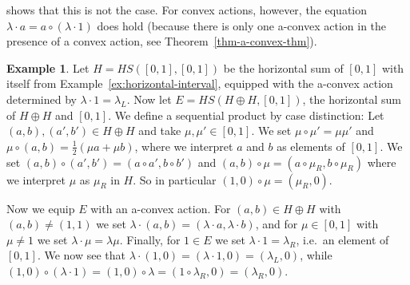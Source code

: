 \documentclass[a4paper, onecolumn, accepted=2020-12-22]{quantumarticle}
\newcommand{\mult}{\mathop{\circ}}
\newcounter{counter}
\theoremstyle{definition}
\newtheorem{example}[counter]{Example}
\begin{document}
shows that this is not the case.
For convex actions, however,
the equation $\lambda\cdot a=a\mult(\lambda\cdot 1)$ 
does hold
(because there is only one a-convex action
in the presence of a convex action, see Theorem~\ref{thm-a-convex-thm}).
\begin{example}
  \label{ex-aconvex-not-determined-by-scalars}
    Let $H=HS([0,1],[0,1])$ be the horizontal sum of $[0,1]$ with itself from Example~\ref{ex:horizontal-interval}, equipped with the a-convex action determined by $\lambda\cdot 1 = \lambda_L$.
    Now let $E=HS(H\oplus H, [0,1])$, the horizontal sum of $H\oplus H$ and $[0,1]$. We define a sequential product by case distinction: Let $(a,b),(a',b')\in H\oplus H$ and take $\mu,\mu' \in[0,1]$. We set $\mu\mult \mu' = \mu\mu'$ and $\mu\mult (a,b) = \frac12 (\mu a + \mu b)$, where we interpret $a$ and $b$ as elements of $[0,1]$. We set $(a,b)\mult (a',b') = (a\mult a', b\mult b')$ and $(a,b)\mult \mu = (a\mult \mu_R,b\mult \mu_R)$ where we interpret $\mu$ as $\mu_R$ in $H$. So in particular $(1,0)\mult \mu = (\mu_R,0)$.

    Now we equip $E$ with an a-convex action. For $(a,b)\in H\oplus H$ with $(a,b)\neq (1,1)$ we set $\lambda\cdot (a,b) = (\lambda\cdot a,\lambda\cdot b)$, and for $\mu\in[0,1]$ with $\mu\neq 1$ we set $\lambda\cdot \mu = \lambda\mu$. Finally, for $1\in E$ we set $\lambda\cdot 1 = \lambda_R$, i.e.~an element of $[0,1]$. We now see that $\lambda\cdot (1,0) = (\lambda\cdot 1,0) = (\lambda_L,0)$, while $(1,0)\mult (\lambda\cdot 1) = (1,0)\mult \lambda = (1\mult \lambda_R,0) = (\lambda_R,0)$.
\end{example}
\end{document}
